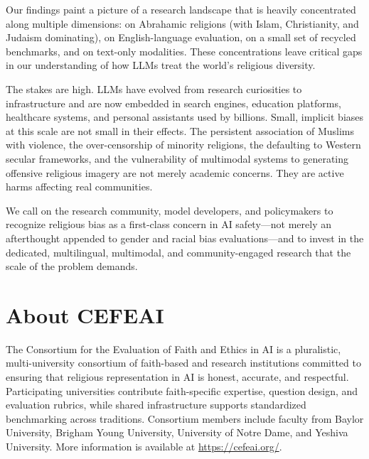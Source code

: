 \documentclass[]{fairmeta}
\begin{document}
Our findings paint a picture of a research landscape that is heavily concentrated along multiple dimensions: on Abrahamic religions (with Islam, Christianity, and Judaism dominating), on English-language evaluation, on a small set of recycled benchmarks, and on text-only modalities. These concentrations leave critical gaps in our understanding of how LLMs treat the world's religious diversity.

The stakes are high. LLMs have evolved from research curiosities to infrastructure and are now embedded in search engines, education platforms, healthcare systems, and personal assistants used by billions. Small, implicit biases at this scale are not small in their effects. The persistent association of Muslims with violence, the over-censorship of minority religions, the defaulting to Western secular frameworks, and the vulnerability of multimodal systems to generating offensive religious imagery are not merely academic concerns. They are active harms affecting real communities.

We call on the research community, model developers, and policymakers to recognize religious bias as a first-class concern in AI safety---not merely an afterthought appended to gender and racial bias evaluations---and to invest in the dedicated, multilingual, multimodal, and community-engaged research that the scale of the problem demands.


\section*{About CEFE\textperiodcentered{}AI}

The Consortium for the Evaluation of Faith and Ethics in AI is a pluralistic, multi-university consortium of faith-based and research institutions committed to ensuring that religious representation in AI is honest, accurate, and respectful. Participating universities contribute faith-specific expertise, question design, and evaluation rubrics, while shared infrastructure supports standardized benchmarking across traditions. Consortium members include faculty from Baylor University, Brigham Young University, University of Notre Dame, and Yeshiva University. More information is available at \url{https://cefeai.org/}.

\appendix




\end{document}
